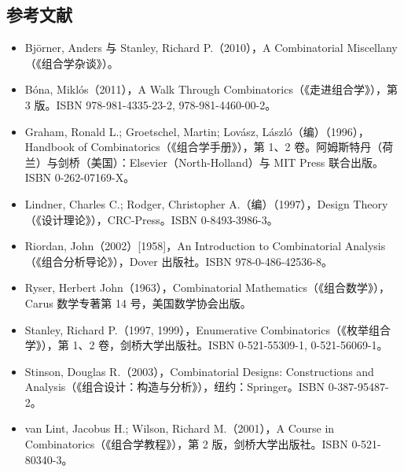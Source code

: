 \subsection{参考文献}
\begin{itemize}
  \item Björner, Anders 与 Stanley, Richard P.（2010），A Combinatorial Miscellany（《组合学杂谈》）。  
  \item Bóna, Miklós（2011），A Walk Through Combinatorics（《走进组合学》），第 3 版。ISBN 978-981-4335-23-2, 978-981-4460-00-2。  
  \item Graham, Ronald L.; Groetschel, Martin; Lovász, László（编）（1996），Handbook of Combinatorics（《组合学手册》），第 1、2 卷。阿姆斯特丹（荷兰）与剑桥（美国）：Elsevier（North-Holland）与 MIT Press 联合出版。ISBN 0-262-07169-X。  
  \item Lindner, Charles C.; Rodger, Christopher A.（编）（1997），Design Theory（《设计理论》），CRC-Press。ISBN 0-8493-3986-3。  
  \item Riordan, John（2002）[1958]，An Introduction to Combinatorial Analysis（《组合分析导论》），Dover 出版社。ISBN 978-0-486-42536-8。  
  \item Ryser, Herbert John（1963），Combinatorial Mathematics（《组合数学》），Carus 数学专著第 14 号，美国数学协会出版。  
  \item Stanley, Richard P.（1997, 1999），Enumerative Combinatorics（《枚举组合学》），第 1、2 卷，剑桥大学出版社。ISBN 0-521-55309-1, 0-521-56069-1。  
  \item Stinson, Douglas R.（2003），Combinatorial Designs: Constructions and Analysis（《组合设计：构造与分析》），纽约：Springer。ISBN 0-387-95487-2。  
  \item van Lint, Jacobus H.; Wilson, Richard M.（2001），A Course in Combinatorics（《组合学教程》），第 2 版，剑桥大学出版社。ISBN 0-521-80340-3。  
\end{itemize}
